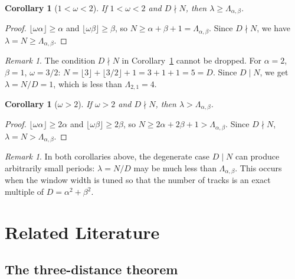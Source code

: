 \documentclass[11pt]{article}
\theoremstyle{plain}
\newtheorem{corollary}[theorem]{Corollary}
\theoremstyle{definition}
\theoremstyle{remark}
\newtheorem{remark}[theorem]{Remark}
\begin{document}
\begin{corollary}[$1 < \omega < 2$]\label{cor:medium_omega}
If $1 < \omega < 2$ and $D \nmid N$, then
$\lambda \ge \Lambda_{\alpha,\beta}$.
\end{corollary}
\begin{proof}
$\lfloor\omega\alpha\rfloor \ge \alpha$ and
$\lfloor\omega\beta\rfloor \ge \beta$, so
$N \ge \alpha + \beta + 1 = \Lambda_{\alpha,\beta}$.
Since $D \nmid N$, we have $\lambda = N \ge \Lambda_{\alpha,\beta}$.
\end{proof}

\begin{remark}
The condition $D \nmid N$ in Corollary~\ref{cor:medium_omega} cannot be
dropped.  For $\alpha = 2$, $\beta = 1$, $\omega = 3/2$:
$N = \lfloor 3 \rfloor + \lfloor 3/2 \rfloor + 1 = 3 + 1 + 1 = 5 = D$.
Since $D \mid N$, we get $\lambda = N/D = 1$, which is less than
$\Lambda_{2,1} = 4$.
\end{remark}

\begin{corollary}[$\omega > 2$]\label{cor:large_omega}
If $\omega > 2$ and $D \nmid N$, then
$\lambda > \Lambda_{\alpha,\beta}$.
\end{corollary}
\begin{proof}
$\lfloor\omega\alpha\rfloor \ge 2\alpha$ and
$\lfloor\omega\beta\rfloor \ge 2\beta$, so
$N \ge 2\alpha + 2\beta + 1 > \Lambda_{\alpha,\beta}$.
Since $D \nmid N$, $\lambda = N > \Lambda_{\alpha,\beta}$.
\end{proof}

\begin{remark}
In both corollaries above, the degenerate case $D \mid N$ can produce
arbitrarily small periods: $\lambda = N/D$ may be much less than
$\Lambda_{\alpha,\beta}$.
This occurs when the window width is tuned so that the number of tracks
is an exact multiple of $D = \alpha^2 + \beta^2$.
\end{remark}

\section{Related Literature}\label{sec:literature}

\subsection{The three-distance theorem}
\end{document}

